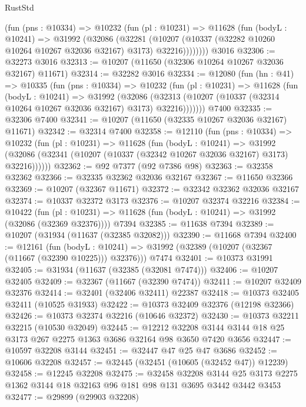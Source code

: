 \begin{lexlean}{RustStd}
\begin{coremodule}
        (fun (pns : @10334) =>
        @10232
          (fun (pl : @10231) =>
          @11628
            (fun (bodyL : @10241) =>
            @31992
              (@32086
                (@32281
                  (@10207 (@10337 (@32282 @10260 @10264 @10267 @32036 @32167) @3173) @32216))))))))
    @3016
@32306 := @32273 @3016
@32313 := @10207 (@11650 (@32306 @10264 @10267 @32036 @32167) @11671)
@32314 := @32282 @3016
@32334 := @12080
    (fun (hn : @41) =>
    @10335
      (fun (pns : @10334) =>
      @10232
        (fun (pl : @10231) =>
        @11628
          (fun (bodyL : @10241) =>
          @31992
            (@32086
              (@32313 (@10207 (@10337 (@32314 @10264 @10267 @32036 @32167) @3173) @32216)))))))
    @7400
@32335 := @32306 @7400
@32341 := @10207 (@11650 (@32335 @10267 @32036 @32167) @11671)
@32342 := @32314 @7400
@32358 := @12110
    (fun (pns : @10334) =>
    @10232
      (fun (pl : @10231) =>
      @11628
        (fun (bodyL : @10241) =>
        @31992 (@32086 (@32341 (@10207 (@10337 (@32342 @10267 @32036 @32167) @3173) @32216))))))
@32362 := @92 @7377 (@92 @7386 @98)
@32363 := @32358 @32362
@32366 := @32335 @32362 @32036 @32167
@32367 := @11650 @32366
@32369 := @10207 (@32367 @11671)
@32372 := @32342 @32362 @32036 @32167
@32374 := @10337 @32372 @3173
@32376 := @10207 @32374 @32216
@32384 := @10422
    (fun (pl : @10231) => @11628 (fun (bodyL : @10241) => @31992 (@32086 (@32369 @32376))))
    @7394
@32385 := @11638 @7394
@32389 := @10207 (@31934 (@11637 (@32385 @32082)))
@32390 := @11668 @7394
@32400 := @12161
    (fun (bodyL : @10241) => @31992 (@32389 (@10207 (@32367 (@11667 (@32390 @10225))) @32376)))
    @7474
@32401 := @10373 @31991
@32405 := @31934 (@11637 (@32385 (@32081 @7474)))
@32406 := @10207 @32405
@32409 := @32367 (@11667 (@32390 @7474))
@32411 := @10207 @32409 @32376
@32414 := @32401 (@32406 @32411) @22387
@32418 := @10373 @32405 @32411 (@10525 @31933)
@32422 := @10373 @32409 @32376 (@12198 @32366)
@32426 := @10373 @32374 @32216 (@10646 @32372)
@32430 := @10373 @32211 @32215 (@10530 @32049)
@32445 := @12212
    @32208
    @3144
    @3144
    @18
    @25
    @3173
    @267
    @2275
    @1363
    @3686
    @32164
    @98
    @3650
    @7420
    @3656
@32447 := @10597 @32208 @3144
@32451 := @32447 @47 @25 @47 @3686
@32452 := @10606 @32208
@32457 := @32445 (@32451 (@10605 (@32452 @47)) @12239)
@32458 := @12245 @32208
@32475 := @32458
    @32208
    @3144
    @25
    @3173
    @2275
    @1362
    @3144
    @18
    @32163
    @96
    @181
    @98
    @131
    @3695
    @3442
    @3442
    @3453
@32477 := @29899 (@29903 @32208)

\end{coremodule}
\end{lexlean}
